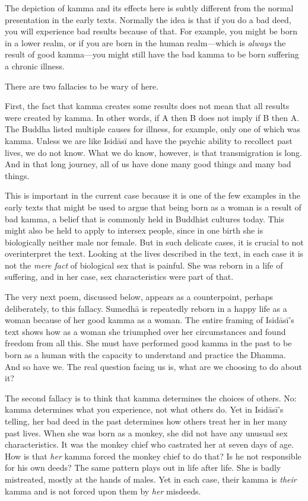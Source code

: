 \documentclass[12pt,openany]{book}%
\begin{document}
The depiction of kamma and its effects here is subtly different from the normal presentation in the early texts. Normally the idea is that if you do a bad deed, you will experience bad results because of that. For example, you might be born in a lower realm, or if you are born in the human realm—which is \emph{always} the result of good kamma—you might still have the bad kamma to be born suffering a chronic illness.

There are two fallacies to be wary of here.

First, the fact that kamma creates some results does not mean that all results were created by kamma. In other words, if A then B does not imply if B then A. The Buddha listed multiple causes for illness, for example, only one of which was kamma. Unless we are like \textsanskrit{Isidāsī} and have the psychic ability to recollect past lives, we do not know. What we do know, however, is that transmigration is long. And in that long journey, all of us have done many good things and many bad things.

This is important in the current case because it is one of the few examples in the early texts that might be used to argue that being born as a woman is a result of bad kamma, a belief that is commonly held in Buddhist cultures today. This might also be held to apply to intersex people, since in one birth she is biologically neither male nor female. But in such delicate cases, it is crucial to not overinterpret the text. Looking at the lives described in the text, in each case it is not the \emph{mere fact} of biological sex that is painful. She was reborn in a life of suffering, and in her case, sex characteristics were part of that.

The very next poem, discussed below, appears as a counterpoint, perhaps deliberately, to this fallacy. \textsanskrit{Sumedhā} is repeatedly reborn in a happy life as a woman because of her good kamma as a woman. The entire framing of \textsanskrit{Isidāsī}’s text shows how as a woman she triumphed over her circumstances and found freedom from all this. She must have performed good kamma in the past to be born as a human with the capacity to understand and practice the Dhamma. And so have we. The real question facing us is, what are we choosing to do about it?

The second fallacy is to think that kamma determines the choices of others. No: kamma determines what you experience, not what others do. Yet in \textsanskrit{Isidāsī}’s telling, her bad deed in the past determines how others treat her in her many past lives. When she was born as a monkey, she did not have any unusual sex characteristics. It was the monkey chief who castrated her at seven days of age. How is that \emph{her} kamma forced the monkey chief to do that? Is he not responsible for his own deeds? The same pattern plays out in life after life. She is badly mistreated, mostly at the hands of males. Yet in each case, their kamma is \emph{their} kamma and is not forced upon them by \emph{her} misdeeds.
\end{document}
